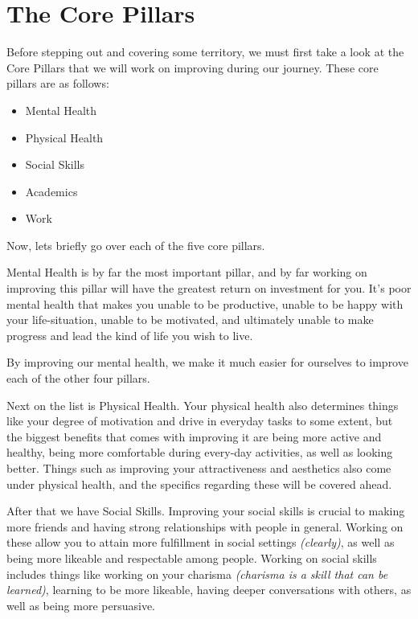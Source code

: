 \documentclass[
]{book}
\providecommand{\tightlist}{%
  \setlength{\itemsep}{0pt}\setlength{\parskip}{0pt}}
\begin{document}
\hypertarget{the-core-pillars}{%
\chapter{The Core Pillars}\label{the-core-pillars}}

Before stepping out and covering some territory, we must first take a look at the Core Pillars that we will work on improving during our journey. These core pillars are as follows:

\begin{itemize}
\tightlist
\item
  Mental Health
\item
  Physical Health
\item
  Social Skills
\item
  Academics
\item
  Work
\end{itemize}

Now, lets briefly go over each of the five core pillars.

Mental Health is by far the most important pillar, and by far working on improving this pillar will have the greatest return on investment for you. It's poor mental health that makes you unable to be productive, unable to be happy with your life-situation, unable to be motivated, and ultimately unable to make progress and lead the kind of life you wish to live.

By improving our mental health, we make it much easier for ourselves to improve each of the other four pillars.

Next on the list is Physical Health. Your physical health also determines things like your degree of motivation and drive in everyday tasks to some extent, but the biggest benefits that comes with improving it are being more active and healthy, being more comfortable during every-day activities, as well as looking better. Things such as improving your attractiveness and aesthetics also come under physical health, and the specifics regarding these will be covered ahead.

After that we have Social Skills. Improving your social skills is crucial to making more friends and having strong relationships with people in general. Working on these allow you to attain more fulfillment in social settings \emph{(clearly)}, as well as being more likeable and respectable among people. Working on social skills includes things like working on your charisma \emph{(charisma is a skill that can be learned)}, learning to be more likeable, having deeper conversations with others, as well as being more persuasive.
\end{document}
